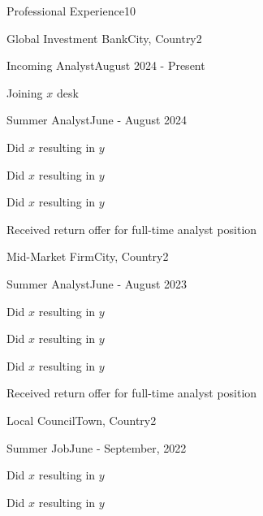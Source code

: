 \documentclass[10pt,a4paper]{CV}
\begin{document}
\begin{Section}{Professional Experience}{10}
    \begin{Institution}{Global Investment Bank}{City, Country}{2}
        \begin{Position}{Incoming Analyst}{August 2024 - Present}
            \item Joining $x$ desk
            \vspace{-4pt}
        \end{Position}
        \begin{Position}{Summer Analyst}{June - August 2024}
            \item Did $x$ resulting in $y$
            \item Did $x$ resulting in $y$
            \item Did $x$ resulting in $y$
            \item Received return offer for full-time analyst position
        \end{Position}
    \end{Institution}
    
    \begin{Institution}{Mid-Market Firm}{City, Country}{2}
        \begin{Position}{Summer Analyst}{June - August 2023}
            \item Did $x$ resulting in $y$
            \item Did $x$ resulting in $y$
            \item Did $x$ resulting in $y$
            \item Received return offer for full-time analyst position
        \end{Position}
    \end{Institution}
    
    \begin{Institution}{Local Council}{Town, Country}{2}
        \begin{Position}{Summer Job}{June - September, 2022}
            \item Did $x$ resulting in $y$
            \item Did $x$ resulting in $y$
        \end{Position}
    \end{Institution}
\end{Section}
\end{document}
